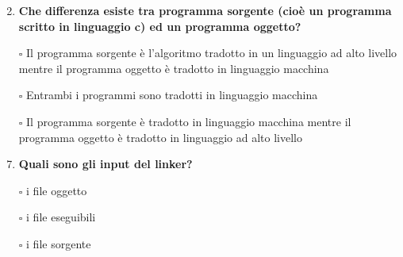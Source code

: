 \documentclass[11pt]{article}
\begin{document}
\begin{enumerate}
\item [\nonumber]
\item {\bf Che differenza esiste tra programma sorgente (cio\`{e} un programma scritto in linguaggio c) ed un programma oggetto?}

\item[$\square$]Il programma sorgente \`{e} l'algoritmo tradotto in un linguaggio ad alto livello mentre il programma oggetto \`{e} tradotto in linguaggio macchina
\item[$\square$]Entrambi i programmi sono tradotti in linguaggio macchina
\item[$\square$]Il programma sorgente \`{e} tradotto in linguaggio macchina mentre il programma oggetto \`{e} tradotto in linguaggio ad alto livello

\item [\nonumber]
\item {\bf Quali sono gli input del linker?}
\item[$\square$] i file oggetto
\item[$\square$] i file eseguibili
\item[$\square$] i file sorgente

\end{enumerate}



 
\end{document}
